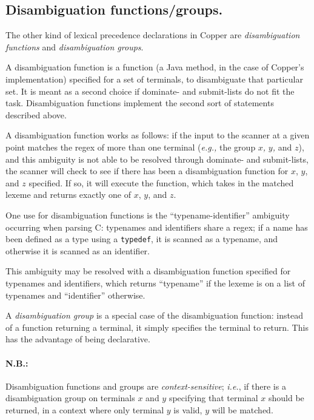 \documentclass[12pt,english,twoside]{report}
\begin{document}
\subsection{Disambiguation functions/groups.}

The other kind of lexical precedence declarations in Copper are \emph{disambiguation
functions} and \emph{disambiguation groups}.

A disambiguation function is a function (a Java method, in the case
of Copper's implementation) specified for a set of terminals, to disambiguate
that particular set. It is meant as a second choice if dominate- and
submit-lists do not fit the task. Disambiguation functions implement
the second sort of statements described above.

A disambiguation function works as follows: if the input to the scanner
at a given point matches the regex of more than one terminal (\emph{e.g.,}
the group \emph{}$x$\emph{,} $y$\emph{,} and \emph{}$z$), and this
ambiguity is not able to be resolved through dominate- and submit-lists,
the scanner will check to see if there has been a disambiguation function
for $x$, $y$, and $z$ specified. If so, it will execute the function,
which takes in the matched lexeme and returns exactly one of $x$,
$y$, and $z$.

One use for disambiguation functions is the {}``typename-identifier''
ambiguity occurring when parsing C: typenames and identifiers share
a regex; if a name has been defined as a type using a \texttt{typedef},
it is scanned as a typename, and otherwise it is scanned as an identifier.

This ambiguity may be resolved with a disambiguation function specified
for typenames and identifiers, which returns {}``typename'' if the
lexeme is on a list of typenames and {}``identifier'' otherwise.

A \emph{disambiguation group} is a special case of the disambiguation
function: instead of a function returning a terminal, it simply specifies
the terminal to return. This has the advantage of being declarative.


\paragraph{N.B.:}

Disambiguation functions and groups are \emph{context-sensitive};
\emph{i.e.}, if there is a disambiguation group on terminals $x$
and $y$ specifying that terminal $x$ should be returned, in a context
where only terminal $y$ is valid, $y$ will be matched.
\end{document}
